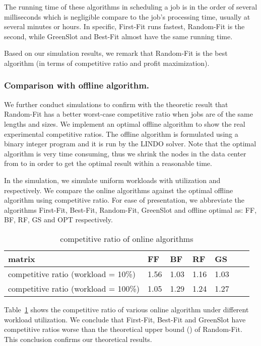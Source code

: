 \documentclass[conference]{IEEEtran}
\begin{document}
The running time of these algorithms in scheduling a job is in the order of several milliseconds which is negligible compare to the job's processing time, usually at several minutes or hours. In specific, First-Fit runs fastest, Random-Fit is the second, while GreenSlot and Best-Fit almost have the same running time.

Based on our simulation results, we remark that Random-Fit is the best algorithm (in terms of competitive ratio and profit maximization).

\subsubsection{Comparison with offline algorithm.}

We further conduct simulations to confirm with the theoretic result that Random-Fit has a better worst-case competitive ratio when jobs are of the same lengths and sizes. We implement an optimal offline algorithm to show the real experimental competitive ratios. The offline algorithm is formulated using a binary integer program and it is run by the LINDO solver. Note that the optimal algorithm is very time consuming, thus we shrink the nodes in the data center from  to  in order to get the optimal result within a reasonable time.

In the simulation, we simulate  uniform workloads with utilization  and  respectively. We compare the online algorithms against the optimal offline algorithm using competitive ratio. For ease of presentation, we abbreviate the algorithms First-Fit, Best-Fit, Random-Fit, GreenSlot and offline optimal as: FF, BF, RF, GS and OPT respectively.



\begin{table}[!ht]
\centering
\caption{competitive ratio of online algorithms}
\begin{tabular}{|l|l|l|l|l|l|l|}  \hline
matrix & FF & BF & RF & GS \\ \hline \hline
competitive ratio (workload = 10\%) &1.56&	1.03&	1.16&	1.03\\ \hline
competitive ratio (workload = 100\%)      &   1.05 &   1.29   & 1.24 &   1.27   \\ \hline
\end{tabular}
\label{tb_com_opt_20}
\end{table}



Table~\ref{tb_com_opt_20} shows the competitive ratio of various online algorithm under different workload utilization. We conclude that First-Fit, Best-Fit and GreenSlot have competitive ratios worse than the theoretical upper bound () of Random-Fit. This conclusion confirms our theoretical results.
\end{document}
